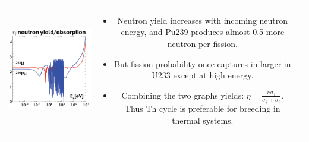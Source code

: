 \documentclass{school-22.211-notes}
\begin{document}
\begin{enumerate}
\begin{tabular}{ccc}
\begin{minipage}[b]{0.3\linewidth}
      \includegraphics[width=\textwidth]{images/dfs/U-vs-Th-2.png}
    \end{minipage}
    &
    \begin{minipage}[b]{0.38\linewidth}
      \begin{itemize}
      \item Neutron yield increases with incoming neutron energy, and Pu239 produces almost 0.5 more neutron per fission. 
      \item But fission probability once captures in larger in U233 except at high energy. 
      \item Combining the two graphs yields: $\eta = \frac{\nu \sigma_f}{\sigma_f + \sigma_c}$. Thus Th cycle is preferable for breeding in thermal systems. 
      \end{itemize}
    \end{minipage}
  \end{tabular}
      

\end{enumerate}
\end{document}
